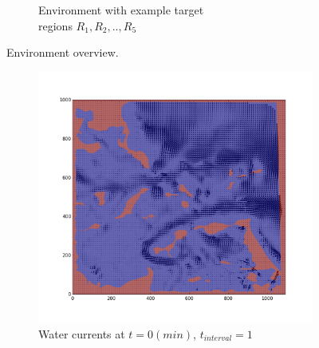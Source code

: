 \documentclass{tamuccthesis}
\begin{document}
\begin{figure}[H]
\begin{subfigure}[b]{0.475\textwidth}
        \caption{{\small Environment with example target \\ regions $R_1, R_2, .., R_5$}}   
        \label{fig:env_targets}
    \end{subfigure}
    \caption[Environment overview.]{Environment overview.}
    \label{fig:env}
\end{figure}

\begin{figure}[H]
    \captionsetup{justification=centering}
    \centering
    \begin{subfigure}[b]{0.475\textwidth}
        \centering
        \includegraphics[width=\textwidth,trim={3cm 3cm 3cm 3cm},clip]{Fig_currentsMap-1.png}
        \caption{{\small Water currents at $t = 0 (min)$, $t_{interval} = 1$}}    
        \label{fig:currents_interval_1}
    \end{subfigure}
    \hfill
    \begin{subfigure}[b]{0.475\textwidth}  
        \centering 

\end{subfigure}
\end{figure}
\end{document}
